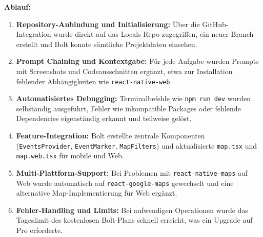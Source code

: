 \textbf{Ablauf:}
\begin{enumerate}
      \item \textbf{Repository-Anbindung und Initialisierung:} Über die GitHub-Integration wurde direkt auf das Locals-Repo zugegriffen, ein neuer Branch erstellt und Bolt konnte sämtliche Projektdaten einsehen.
      \item \textbf{Prompt Chaining und Kontextgabe:} Für jede Aufgabe wurden Prompts mit Screenshots und Codeausschnitten ergänzt, etwa zur Installation fehlender Abhängigkeiten wie \texttt{react-native-web}.
      \item \textbf{Automatisiertes Debugging:} Terminalbefehle wie \texttt{npm run dev} wurden selbständig ausgeführt, Fehler wie inkompatible Packages oder fehlende Dependencies eigenständig erkannt und teilweise gelöst.
      \item \textbf{Feature-Integration:} Bolt erstellte zentrale Komponenten (\texttt{EventsProvider}, \texttt{EventMarker}, \texttt{MapFilters}) und aktualisierte \texttt{map.tsx} und \texttt{map.web.tsx} für mobile und Web.
      \item \textbf{Multi-Plattform-Support:} Bei Problemen mit \texttt{react-native-maps} auf Web wurde automatisch auf \texttt{react-google-maps} gewechselt und eine alternative Map-Implementierung für Web ergänzt.
      \item \textbf{Fehler-Handling und Limits:} Bei aufwendigen Operationen wurde das Tageslimit des kostenlosen Bolt-Plans schnell erreicht, was ein Upgrade auf Pro erforderte.
\end{enumerate}

